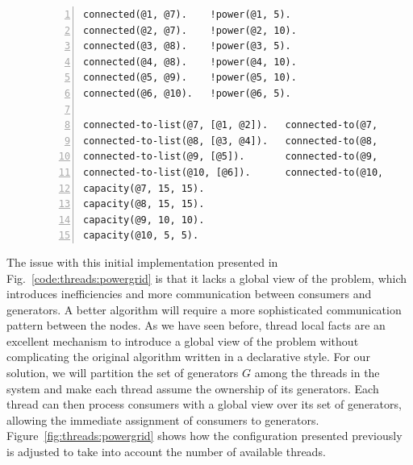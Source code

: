 \begin{figure}[h!]
\begin{Verbatim}[numbers=left,fontsize=\codesize,commandchars=*\#\&]
connected(@1, @7).    !power(@1, 5).
connected(@2, @7).    !power(@2, 10).
connected(@3, @8).    !power(@3, 5).
connected(@4, @8).    !power(@4, 10).
connected(@5, @9).    !power(@5, 10).
connected(@6, @10).   !power(@6, 5).

connected-to-list(@7, [@1, @2]).   connected-to(@7, @1, 5).   connected-to(@7, @2, 10).
connected-to-list(@8, [@3, @4]).   connected-to(@8, @3, 5).   connected-to(@8, @4, 10).
connected-to-list(@9, [@5]).       connected-to(@9, @5, 10).
connected-to-list(@10, [@6]).      connected-to(@10, @6, 5).
capacity(@7, 15, 15).
capacity(@8, 15, 15).
capacity(@9, 10, 10).
capacity(@10, 5, 5).
\end{Verbatim}
\label{code:threads:powergrid_final}
\end{figure}

The issue with this initial implementation presented in
Fig.~\ref{code:threads:powergrid} is that it lacks a global view of the problem,
which introduces inefficiencies and more communication between consumers and
generators. A better algorithm will require a more sophisticated communication
pattern between the nodes. As we have seen before, thread local facts are an
excellent mechanism to introduce a global view of the problem without
complicating the original algorithm written in a declarative style. For our
solution, we will partition the set of generators $G$ among the threads in the
system and make each thread assume the ownership of its generators. Each thread
can then process consumers with a global view over its set of generators,
allowing the immediate assignment of consumers to generators.
Figure~\ref{fig:threads:powergrid} shows how the configuration presented
previously is adjusted to take into account the number of available threads.

